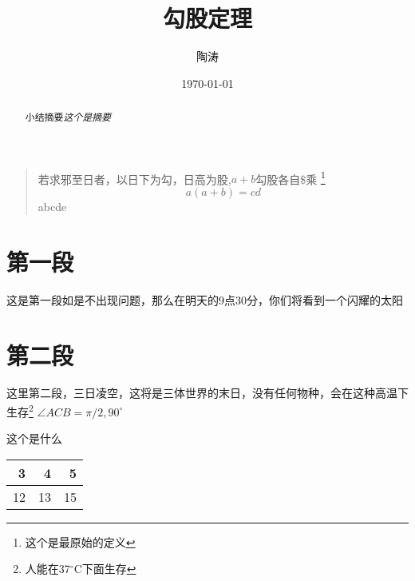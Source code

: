 \documentclass[UTF8]{ctexart}
\title{勾股定理}
\author{陶涛}
\date{\today}
\begin{document}

\centering
\begin{abstract}
小结摘要\emph{这个是摘要}
\end{abstract}

\begin{quote}
\kaishu 若求邪至日者，以日下为勾，日高为股,$a+b$勾股各自\$乘 \footnote{这个是最原始的定义}
\begin{equation}
a(a+b)=cd
\end{equation}
\textgreek{abcde}
\end{quote}

\section{第一段}
这是第一段如是不出现问题，那么在明天的9点30分，你们将看到一个闪耀的太阳

\section{第二段}
这里第二段，三日凌空，这将是三体世界的末日，没有任何物种，会在这种高温下生存\footnote{人能在37$^\circ$C下面生存}
$\angle ACB=\pi /2,90^\circ$


\raggedrignt
这个是什么
\begin{table}
\begin{tabular}{|rrr|}
\hline
3&4&5\\
\hline
12&13&15\\

\hline
\end{tabular}%

\end{table}
\the\parindent


\end{document}
